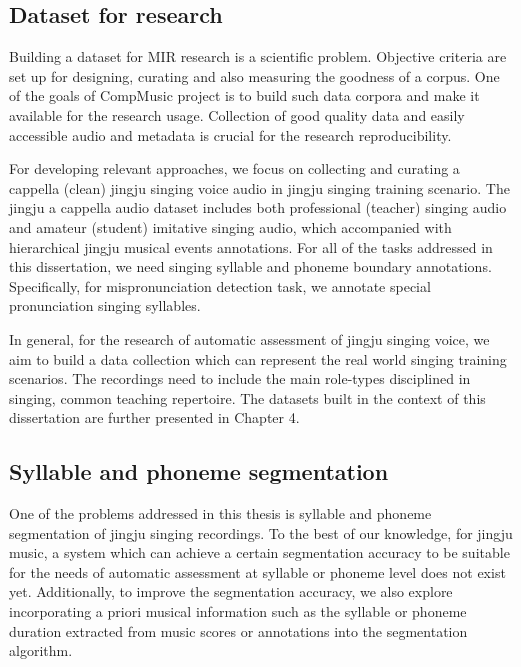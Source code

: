 \subsection{Dataset for research}\label{sec:ch3:dataset_research}

Building a dataset for MIR research is a scientific problem. Objective criteria are set up for designing, curating and also measuring the goodness of a corpus. One of the goals of CompMusic project is to build such data corpora and make it available for the research usage. Collection of good quality data and easily accessible audio and metadata is crucial for the research reproducibility.

For developing relevant approaches, we focus on collecting and curating a cappella (clean) jingju singing voice audio in jingju singing training scenario. The jingju a cappella audio dataset includes both professional (teacher) singing audio and amateur (student) imitative singing audio, which accompanied with hierarchical jingju musical events annotations. For all of the tasks addressed in this dissertation, we need singing syllable and phoneme boundary annotations. Specifically, for mispronunciation detection task, we annotate special pronunciation singing syllables. 

In general, for the research of automatic assessment of jingju singing voice, we aim to build a data collection which can represent the real world singing training scenarios. The recordings need to include the main role-types disciplined in singing, common teaching repertoire. The datasets built in the context of this dissertation are further presented in Chapter 4.

\subsection{Syllable and phoneme segmentation}\label{sec:ch3:segmentation_formulation}

One of the problems addressed in this thesis is syllable and phoneme segmentation of jingju singing recordings. To the best of our knowledge, for jingju music, a system which can achieve a certain segmentation accuracy to be suitable for the needs of automatic assessment at syllable or phoneme level does not exist yet. Additionally, to improve the segmentation accuracy, we also explore incorporating a priori musical information such as the syllable or phoneme duration extracted from music scores or annotations into the segmentation algorithm.

